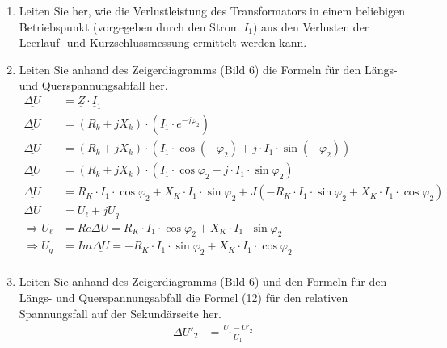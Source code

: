 \begin{enumerate}[label=\alph*)]
	\item Leiten Sie her, wie die Verlustleistung des Transformators in einem beliebigen
	      Betriebspunkt (vorgegeben durch den Strom $I_1$) aus den Verlusten der
	      Leerlauf- und Kurzschlussmessung ermittelt werden kann.
	\item Leiten Sie anhand des Zeigerdiagramms (Bild 6) die Formeln für den Längs- und
	      Querspannungsabfall her.
	      \begin{align*}
		      \underline{\Delta U} & = \underline Z\cdot \underline I_1                                                                                                        \\
		      \underline{\Delta U} & = (R_k+ jX_k)\cdot (I_1\cdot e^{-j\varphi_2})                                                                                             \\
		      \underline{\Delta U} & = (R_k+ jX_k)\cdot \left(I_1\cdot\cos(-\varphi_2)+j\cdot I_1\cdot \sin(-\varphi_2)\right)                                                 \\
		      \underline{\Delta U} & = (R_k+ jX_k)\cdot \left(I_1\cdot\cos\varphi_2-j\cdot I_1\cdot \sin\varphi_2\right)                                                       \\
		      \underline{\Delta U} & = R_K\cdot I_1\cdot \cos\varphi_2 + X_K\cdot I_1 \cdot \sin\varphi_2+J(-R_K\cdot I_1 \cdot \sin\varphi_2+X_K\cdot I_1\cdot \cos\varphi_2) \\
		      \underline{\Delta U} & = U_\ell +jU_q                                                                                                                            \\
		      \Rightarrow U_\ell   & =Re{\underline{\Delta U}}=R_K\cdot I_1 \cdot\cos \varphi_2 + X_K \cdot I_1\cdot \sin \varphi_2                                            \\
		      \Rightarrow U_q      & =Im{\underline{\Delta U}}= -R_K\cdot I_1 \cdot\sin \varphi_2 + X_K \cdot I_1\cdot \cos \varphi_2                                          \\
	      \end{align*}
	\item Leiten Sie anhand des Zeigerdiagramms (Bild 6) und den Formeln für den Längs-
	      und Querspannungsabfall die Formel (12) für den relativen Spannungsfall auf der
	      Sekundärseite her.
	      \begin{align*}
		      \Delta U'_2                            & = \frac{U_1 - U'_2}{U_1}                                                                                                \\

\end{align*}
\end{enumerate}
